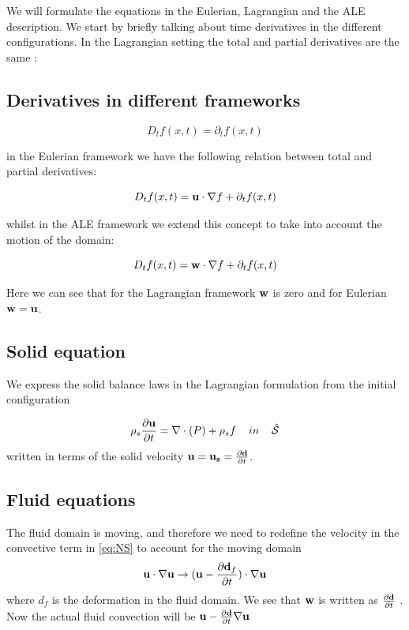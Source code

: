 We will formulate the equations in the Eulerian, Lagrangian and the ALE description. We start by briefly talking about time derivatives in the different configurations. In the Lagrangian setting the total and partial derivatives are the same \cite{Wick2011}:

\subsection{Derivatives in different frameworks}
\begin{equation}
D_t f(x,t) = \partial_t f(x,t) 
\end{equation}

in the Eulerian framework we have the following relation between total and partial derivatives:

\begin{equation}
D_t f(x,t) = \bold{u}\cdot \nabla{f} + \partial_t f(x,t)
\end{equation}

whilst in the ALE framework we extend this concept to take into account the motion of the domain:

\begin{equation}
D_t f(x,t) = \bold{w} \cdot\nabla{f} + \partial_t f(x,t)
\end{equation}

Here we can see that for the Lagrangian framework $ \bold{w}$ is zero and for Eulerian $\bold{w} = \bold{u}$.

\subsection{Solid equation}
We express the solid balance laws in the Lagrangian formulation from the initial configuration

\begin{equation}
\rho_s \frac{\partial \bold{u}}{\partial t} = \nabla \cdot (P) + \rho_s f \hspace{4mm}in\hspace{4mm} \hat{\mathcal{S}} 
\end{equation}
written in terms of the solid velocity $\bold{u} = \bold{u_s} = \frac{\partial \bold{d}}{\partial t}$.

\subsection{Fluid equations}


The fluid domain is moving, and therefore we need to redefine the velocity in the convective term in \eqref{eq:NS} to account for the moving domain 
\begin{equation}
\bold{u} \cdot \nabla \bold{u} \rightarrow (\bold{u}-\frac{\partial \bold{d}_f}{\partial t}) \cdot \nabla \bold{u}  
\end{equation}
where $d_f$ is the deformation in the fluid domain. We see that $\bold{w}$ is written as $\frac{\partial \bold{d}}{\partial t}$ . Now the actual fluid convection will be $\bold{u}-\frac{\partial \bold{d}}{\partial t} \nabla \bold{u}$ 

